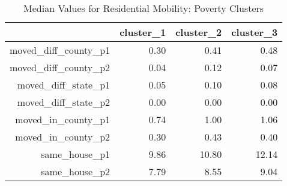 \begin{table}[ht]
    \centering
    \caption{Median Values for Residential Mobility: Poverty Clusters}
    \label{tab:trans_pov}
    \begin{tabular}{|r|r|r|r|}
      \hline
     & cluster\_1 & cluster\_2 & cluster\_3 \\ 
      \hline
    moved\_diff\_county\_p1 & 0.30 & 0.41 & 0.48 \\
    \hline 
      moved\_diff\_county\_p2 & 0.04 & 0.12 & 0.07 \\ 
      \hline
      moved\_diff\_state\_p1 & 0.05 & 0.10 & 0.08 \\ 
      \hline
      moved\_diff\_state\_p2 & 0.00 & 0.00 & 0.00 \\ 
      \hline
      moved\_in\_county\_p1 & 0.74 & 1.00 & 1.06 \\ 
      \hline
      moved\_in\_county\_p2 & 0.30 & 0.43 & 0.40 \\ 
      \hline
      same\_house\_p1 & 9.86 & 10.80 & 12.14 \\ 
      \hline
      same\_house\_p2 & 7.79 & 8.55 & 9.04 \\ 
       \hline
    \end{tabular}
    \end{table}